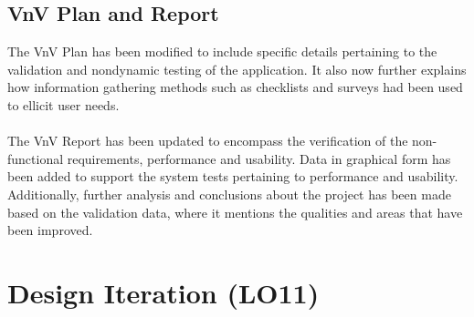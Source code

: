 \documentclass{article}
\begin{document}
\subsection{VnV Plan and Report}

The VnV Plan has been modified to include specific details pertaining to the validation and nondynamic testing of the application. It also now further explains how information gathering methods such as checklists and surveys had been used to ellicit user needs.
\\ \\
The VnV Report has been updated to encompass the verification of the non-functional requirements, performance and usability. Data in graphical form has been added to support the system tests pertaining to performance and usability. Additionally, further analysis and conclusions about the project has been made based on the validation data, where it mentions the qualities and areas that have been improved.

\section{Design Iteration (LO11)}
\end{document}
